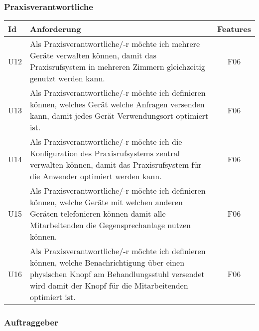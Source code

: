 \clearpage

\subsubsection*{Praxisverantwortliche}

\begin{table}[h]
    \centering
    \begin{tabular}{|l|p{13cm}|c|}
        \hline
        \textbf{Id} & \textbf{Anforderung}                                                                                                                                                                               & \textbf{Features} \\
        \hline
        U12         & Als Praxisverantwortliche/-r möchte ich mehrere Geräte verwalten können, damit das Praxisrufsystem in mehreren Zimmern gleichzeitig genutzt werden kann. & F06 \\
        \hline
        U13         & Als Praxisverantwortliche/-r möchte ich definieren können, welches Gerät welche Anfragen versenden kann, damit jedes Gerät Verwendungsort optimiert ist. & F06 \\
        \hline
        U14         & Als Praxisverantwortliche/-r möchte ich die Konfiguration des Praxisrufsystems zentral verwalten können, damit das Praxisrufsystem für die Anwender optimiert werden kann. & F06 \\
        \hline
        U15         & Als Praxisverantwortliche/-r möchte ich definieren können, welche Geräte mit welchen anderen Geräten telefonieren können damit alle Mitarbeitenden die Gegensprechanlage nutzen können. & F06 \\
        \hline
        U16         & Als Praxisverantwortliche/-r möchte ich definieren können, welche Benachrichtigung über einen physischen Knopf am Behandlungsstuhl versendet wird damit der Knopf für die Mitarbeitenden optimiert ist. & F06 \\
        \hline
    \end{tabular}\label{tab:userstories2}
\end{table}

\subsubsection*{Auftraggeber}\label{subsec:auftraggeber}


